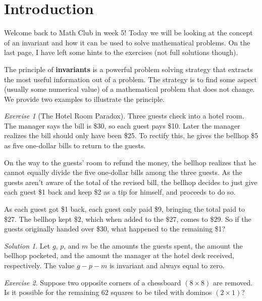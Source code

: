\documentclass{article}
\theoremstyle{definition}
\theoremstyle{remark}
\newtheorem{exercise}{Exercise}
\newtheorem*{solution}{Solution}
\begin{document}

\section{Introduction}

    Welcome back to Math Club in week 5! Today we will be looking at the concept of an invariant and how it can be used to solve mathematical problems. On the last page, I have left some hints to the exercises (not full solutions though).

    The principle of \textbf{invariants} is a powerful problem solving strategy that extracts the most useful information out of a problem. The strategy is to find some aspect (usually some numerical value) of a mathematical problem that does not change. We provide two examples to illustrate the principle.

    \begin{exercise}[The Hotel Room Paradox]
        Three guests check into a hotel room. The manager says the bill is \$30, so each guest pays \$10. Later the manager realizes the bill should only have been \$25. To rectify this, he gives the bellhop \$5 as five one-dollar bills to return to the guests.

        On the way to the guests' room to refund the money, the bellhop realizes that he cannot equally divide the five one-dollar bills among the three guests. As the guests aren't aware of the total of the revised bill, the bellhop decides to just give each guest \$1 back and keep \$2 as a tip for himself, and proceeds to do so.

        As each guest got \$1 back, each guest only paid \$9, bringing the total paid to \$27. The bellhop kept \$2, which when added to the \$27, comes to \$29. So if the guests originally handed over \$30, what happened to the remaining \$1?
    \end{exercise}

    \begin{solution}
        Let \(g\), \(p\), and \(m\) be the amounts the guests spent, the amount the bellhop pocketed, and the amount the manager at the hotel desk received, respectively. The value \(g-p-m\) is invariant and always equal to zero.
    \end{solution}

    \begin{exercise}
        Suppose two opposite corners of a chessboard \((8\times 8)\) are removed. Is it possible for the remaining 62 squares to be tiled with dominos \((2\times 1)\)?
    \end{exercise}
\end{document}
